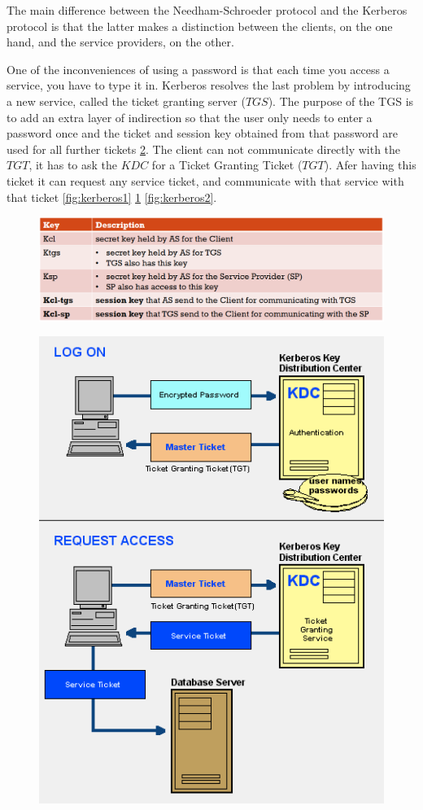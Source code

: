 The main difference between the Needham-Schroeder protocol and the Kerberos protocol is that the latter makes a distinction between the clients, on the one hand, and the service providers, on the other.

One of the inconveniences of using a password is that each time you access a service, you have to type it in. Kerberos resolves the last problem by introducing a new service, called the ticket granting server ($TGS$). The purpose of the TGS is to add an extra layer of indirection so that the user only needs to enter a password once and the ticket and session key obtained from that password are used for all further tickets \ref{fig:kerberos}. The client can not communicate directly with the $TGT$, it has to ask the $KDC$ for a Ticket Granting Ticket ($TGT$). Afer having this ticket it can request any service ticket, and communicate with that service with that ticket \ref{fig:kerberos1} \ref{fig:kerberos-keys} \ref{fig:kerberos2}.


\begin{figure}
	\centering
	\includegraphics[width=0.7\linewidth]{Images/Chapter4/kerberos-keys}
	\caption{}
	\label{fig:kerberos-keys}
\end{figure}

\begin{figure}
	\centering
	\includegraphics[width=0.7\linewidth]{Images/Chapter4/kerberos}
	\caption{}
	\label{fig:kerberos}
\end{figure}

